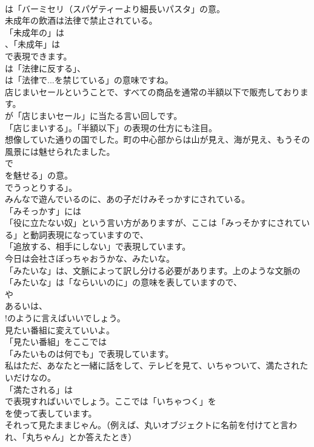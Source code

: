 \documentclass[8pt]{extreport}
\begin{document}
\begin{CJK}{UTF8}{min}
\\	は「バーミセリ（スパゲティーより細長いパスタ」の意。	
\\	未成年の飲酒は法律で禁止されている。 
\\	「未成年の」は
\\	、「未成年」は
\\	で表現できます。
\\	は「法律に反する」、
\\	は「法律で...を禁じている」の意味ですね。	
\\	店じまいセールということで、すべての商品を通常の半額以下で販売しております。 
\\	が「店じまいセール」に当たる言い回しです。
\\	「店じまいする」。「半額以下」の表現の仕方にも注目。	
\\	想像していた通りの国でした。町の中心部からは山が見え、海が見え、もうその風景には魅せられたました。 
\\	で
\\	を魅せる」の意。
\\	でうっとりする」。	
\\	みんなで遊んでいるのに、あの子だけみそっかすにされている。 
\\	「みそっかす」には
\\	「役に立たない奴」という言い方がありますが、ここは「みっそかすにされている」と動詞表現になっていますので、
\\	「追放する、相手にしない」で表現しています。	
\\	今日は会社さぼっちゃおうかな、みたいな。 
\\	「みたいな」は、文脈によって訳し分ける必要があります。上のような文脈の「みたいな」は「ならいいのに」の意味を表していますので、
\\	や
\\	あるいは、
\\	!のように言えばいいでしょう。	
\\	見たい番組に変えていいよ。 
\\	「見たい番組」をここでは
\\	「みたいものは何でも」で表現しています。	
\\	私はただ、あなたと一緒に話をして、テレビを見て、いちゃついて、満たされたいだけなの。 
\\	「満たされる」は 
\\	で表現すればいいでしょう。ここでは「いちゃつく」を 
\\	を使って表しています。	
\\	それって見たままじゃん。（例えば、丸いオブジェクトに名前を付けてと言われ、「丸ちゃん」とか答えたとき） 

\end{CJK}
\end{document}
